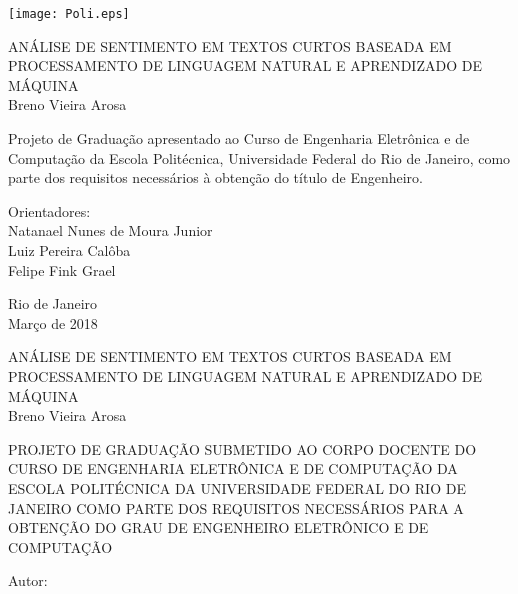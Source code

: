 \texttt{[image: Poli.eps]}

\begin{center}
\large{ANÁLISE DE SENTIMENTO EM TEXTOS CURTOS BASEADA EM PROCESSAMENTO DE LINGUAGEM NATURAL E APRENDIZADO DE MÁQUINA}\\
   \vspace{2cm}
\large{Breno Vieira Arosa}\\
\end{center}
   \vspace{3cm}
\hspace{7cm}
\hfill \parbox{8.0cm}{Projeto de Graduação apresentado ao Curso de Engenharia Eletrônica e de Computação da Escola Politécnica, Universidade Federal do Rio de Janeiro, como parte dos requisitos necessários à obtenção do título de Engenheiro.\\}
   \vspace{2cm}
\hfill \parbox{8.0cm}{Orientadores: \\
                      Natanael Nunes de Moura Junior\\
                      Luiz Pereira Calôba\\
                      Felipe Fink Grael}
\vfill
\begin{center}
Rio de Janeiro \\
Março de 2018
\end{center}

\pagebreak

\begin{center}
\large{ANÁLISE DE SENTIMENTO EM TEXTOS CURTOS BASEADA EM PROCESSAMENTO DE LINGUAGEM NATURAL E APRENDIZADO DE MÁQUINA}\\
   \vspace{0.8cm}
\large{Breno Vieira Arosa}\\
\end{center}
   \vspace{0.8cm}
PROJETO DE GRADUAÇÃO SUBMETIDO AO CORPO DOCENTE DO CURSO DE ENGENHARIA ELETRÔNICA E DE COMPUTAÇÃO DA ESCOLA POLITÉCNICA DA UNIVERSIDADE FEDERAL DO RIO DE JANEIRO COMO PARTE DOS REQUISITOS NECESSÁRIOS PARA A OBTENÇÃO DO GRAU DE ENGENHEIRO ELETRÔNICO E DE COMPUTAÇÃO

   \vspace{0.8cm}
Autor:
      \vspace{0.3cm}
      \begin{flushright}
         \parbox{10cm}{
            \hrulefill

            \vspace{-.375cm}

            \vspace{0.1cm}
         }
      \end{flushright}


